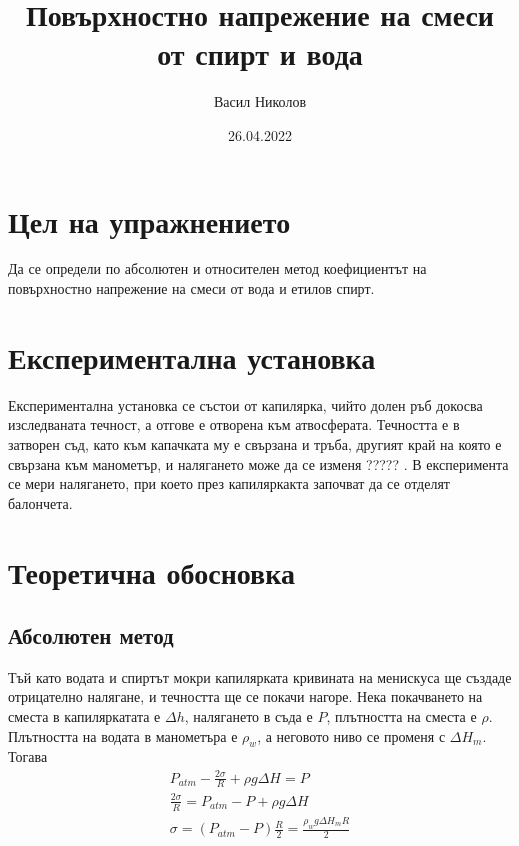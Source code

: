 \documentclass[reprint,amsmath,amssymb,aps,floatfix]{revtex4-2}
\begin{document}
\title{Повърхностно напрежение на смеси от спирт и вода}

\author{Васил Николов}
\date{26.04.2022}
\maketitle

\section{Цел на упражнението}

Да се определи по абсолютен и относителен метод коефициентът на повърхностно напрежение на смеси от вода и етилов спирт. 

\section{Експериментална установка}

Експериментална установка се състои от капилярка, чийто долен ръб докосва изследваната течност, а отгове е отворена към атвосферата. Течността е в затворен съд, като към капачката му е свързана и тръба, другият край на която е свързана към манометър, и налягането може да се изменя ????? . В експеримента се мери налягането, при което през капиляркакта започват да се отделят балончета. 

\section{Теоретична обосновка}
\subsection{Абсолютен метод}

Тъй като водата и спиртът мокри капилярката кривината на менискуса ще създаде отрицателно налягане, и течността ще се покачи нагоре. Нека покачването на сместа в капиляркатата е $\Delta h$, налягането в съда е $P$, плътността на сместа е $\rho$. Плътността на водата в манометъра е $\rho_w$, а неговото ниво се променя с $\Delta H_m$. Тогава 
\begin{gather*}
    P_{atm} - \frac{2\sigma}{R} + \rho g \Delta H = P \\
    \frac{2\sigma}{R} = P_{atm} - P + \rho g \Delta H \\
    \sigma = (P_{atm} - P)\frac{R}{2} = \frac{\rho_w g \Delta H_m R}{2} \label{eq:1} \tag{1}
\end{gather*}
\end{document}
